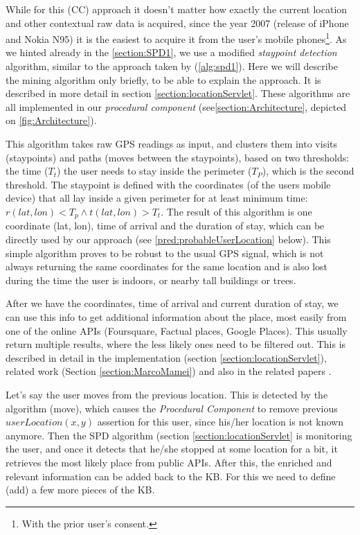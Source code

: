 While for this (CC) approach it doesn't matter how exactly the current location
and other contextual raw data is acquired, since the year 2007 (release of 
iPhone and Nokia N95) it is the easiest to acquire it from the user's mobile 
phones\footnote{With the prior user's consent.}. As we hinted already in the
\autoref{section:SPD1}, we use a modified \emph{staypoint detection} algorithm, 
similar to the approach taken by \textcite{Kang2005} (\autoref{alg:spd1}). 
Here we will describe the mining 
algorithm only briefly, to be able to explain the approach. It is described in
more detail in section \ref{section:locationServlet}. These algorithms are all
implemented in our \emph{procedural component} 
(see\autoref{section:Architecture}, depicted on \autoref{fig:Architecture}).

This algorithm takes raw GPS readings as input, and clusters them into visits
(staypoints) and paths (moves between the staypoints), based on two thresholds:
the time ($T_t$) the user needs to stay
inside the perimeter ($T_P$), which is the second threshold. The staypoint is 
defined with the coordinates (of the users mobile device) that all lay inside a
given perimeter for at least minimum time: 
$r(lat,lon)<T_p \land t(lat,lon)>T_t$. The result of this algorithm is one
coordinate (lat, lon), time of arrival and the duration of stay, which can be
directly used by our approach (see \autoref{pred:probableUserLocation} below). 
This simple algorithm proves 
to be robust to the usual GPS signal, which is not always returning the same 
coordinates for the same location and is also lost during the time the user is
indoors, or nearby tall buildings or trees. 

After we have the coordinates, time of arrival and current duration of stay,
we can use this info to get additional information about the place, most easily
from one of the online APIs (Foursquare, Factual places, Google Places). This
usually return multiple results, where the less likely ones need to be filtered
out. This is described in detail in the implementation 
(section \ref{section:locationServlet}), 
related work (Section \ref{section:MarcoMamei}) and also in the related papers 
\autocite{Mamei2010,Bradesko2015}.

Let's say the user moves from the previous location. This is detected by the
algorithm (move), which causes the \emph{Procedural Component} to remove 
previous $userLocation(x,y)$ assertion for this user, since his/her location is
not known anymore. Then the SPD algorithm (section 
\ref{section:locationServlet} is monitoring the user, and 
once it detects that he/she stopped at some location for a bit, it retrieves 
the most likely place from public APIs. After this, the enriched and relevant 
information can be added 
back to the KB. For this we need to define (add) a few more pieces of the KB.

